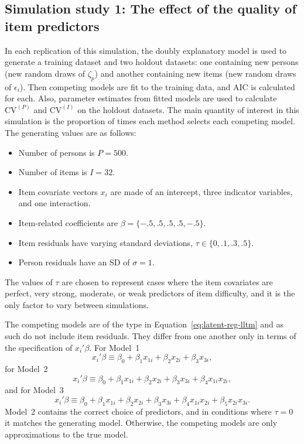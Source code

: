 \documentclass[letterpaper]{article}
\begin{document}
\subsection{Simulation study 1: The effect of the quality of item predictors}

In each replication of this simulation, the doubly explanatory model is used to generate a training dataset and two holdout datasets: one containing new persons (new random draws of $\zeta_p$) and another containing new items (new random draws of $\epsilon_i$). 
Then competing models are fit to the training data, and AIC is calculated for each.  
Also, parameter estimates from fitted models are used to calculate $\mathrm{CV}^{(P)}$ and $\mathrm{CV}^{(I)}$ on the holdout datasets. The main quantity of interest in this simulation is the proportion of times each method selects each competing model. The generating values are as follows:
\begin{itemize}
	\item Number of persons is $P = 500$.
	\item Number of items is $I= 32$.
	\item Item covariate vectors $x_i$ are made of an intercept, three indicator variables, and one interaction.
	\item Item-related coefficients are $\beta = \{-.5, .5, .5, .5, -.5\}$.
	\item Item residuals have varying standard deviations, $\tau \in \{0, .1, .3, .5\}$.
	\item Person residuals have an SD of $\sigma = 1$.
\end{itemize}
The values of $\tau$ are chosen to represent cases where the item covariates are perfect, very strong, moderate, or weak predictors of item difficulty, and it is the only factor to vary between simulations.

The competing models are of the type in Equation~\ref{eq:latent-reg-lltm} and as such do not include item residuals. They differ from one another only in terms of the specification of $x_i'\beta$. For Model~1
\begin{equation} 
	x_i'\beta \equiv \beta_0 + \beta_1 x_{1i} + \beta_2 x_{2i} + \beta_3 x_{3i}
,\end{equation}
for Model~2
\begin{equation} 
	x_i'\beta \equiv \beta_0 + \beta_1 x_{1i} + \beta_2 x_{2i} + \beta_3 x_{3i} + 
		\beta_4 x_{1i} x_{2i}
,\end{equation}
and for Model~3
\begin{equation} 
	x_i'\beta \equiv \beta_0 + \beta_1 x_{1i} + \beta_2 x_{2i} + \beta_3 x_{3i} + 
		\beta_4 x_{1i} x_{2i} + \beta_5 x_{2i} x_{3i}
.\end{equation}
Model~2 contains the correct choice of predictors, and in conditions where $\tau=0$ it matches the generating model. Otherwise, the competing models are only approximations to the true model.
\end{document}
